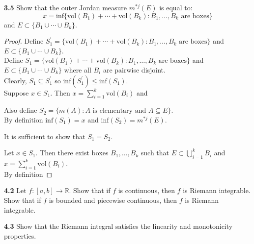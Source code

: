 \documentclass[12pt]{article}
\begin{document}
\hspace{-4 ex}\textbf{3.5} Show that the outer Jordan measure $m^{*j}(E)$ is equal to: $$x = \text{inf}\{\text{vol}(B_1)+\cdots+\text{vol}(B_k) : B_1,\ldots,B_k  \text{ are boxes} \}$$ and $E\subset \{B_1\cup\cdots\cup B_k\}$. \bigbreak

	\begin{proof}
		Define $S_1^\prime =  \{\text{vol}(B_1)+\cdots+\text{vol}(B_k) : B_1,\ldots,B_k  \text{ are boxes} \}$ and $E\subset \{B_1\cup\cdots\cup B_k\}$. \\
		Define $S_1 =  \{\text{vol}(B_1)+\cdots+\text{vol}(B_k) : B_1,\ldots,B_k  \text{ are boxes} \}$ and $E\subset \{B_1\cup\cdots\cup B_k\}$ where all $B_i$ are pairwise disjoint. \\
		Clearly, $S_1 \subseteq S_1^\prime$ so $\text{inf}(S_1^\prime) \leq \text{inf}(S_1) $. \\
		Suppose $x \in S_1$. Then $x = \sum\limits_{i=1}^k \text{vol}(B_i)$ and \bigbreak
		
		Also define $S_2 = \{m(A) : A \text{ is elementary and } A \subseteq E \}$. \\
		By definition $\text{inf}(S_1) = x$ and $\text{inf}(S_2) = m^{*j}(E)$. \bigbreak
		
		It is sufficient to show that $S_1=S_2$. \bigbreak
		
		Let $x \in S_1$. Then there exist boxes $B_1,...,B_k$ such that $E\subset \bigcup\limits_{i=1}^k B_i$ and $x = \sum\limits_{i=1}^k \text{vol}(B_i)$. \\
		By definition 
		
		
		
		
		
	\end{proof}



\hspace{-4 ex}\textbf{4.2} Let $f\colon[a,b]\to\mathbb{R}$. Show that if $f$ is continuous, then $f$ is Riemann integrable. Show that if $f$ is bounded and piecewise continuous, then $f$ is Riemann integrable. \bigbreak





\hspace{-4 ex}\textbf{4.3} Show that the Riemann integral satisfies the linearity and monotonicity properties. \bigbreak
\end{document}
